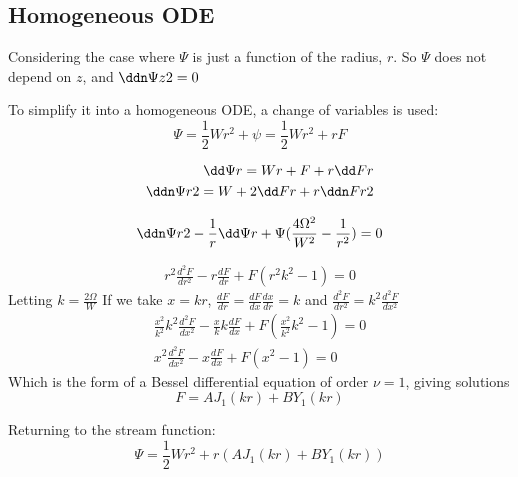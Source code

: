 \documentclass{X:/Documents/Coding/Latex/myreport}
\begin{document}
\clearpage
\subsection{Homogeneous ODE}
Considering the case where $\Psi$ is just a function of the radius, $r$. So $\Psi$ does not depend on $z$, and $\ddn\Psi z2 = 0$ 

To simplify it into a homogeneous ODE, a change of variables is used:
 \[\Psi = \frac12 W r^2 + \psi = \frac12 W r^2 + rF\]

\begin{align*}
    \dd\Psi r = Wr + F + r\dd F r\\
    \ddn\Psi r2 = W + 2\dd F r + r\ddn Fr 2
\end{align*}

\[ \ddn\Psi r2 - \frac1r \dd\Psi r + \Psi(\frac{4\Omega^2}{W^2} - \frac1{r^2}) = 0 \]

\begin{align*}
    r^2 \frac{d^2F}{dr^2} - r \frac{dF}{dr} + F(r^2k^2 - 1) = 0 
\end{align*}
Letting $k = \frac{2\Omega}{W}$
If we take $x = kr$, $\frac{dF}{dr} = \frac{dF}{dx} \frac{dx}{dr} = k$ and $\frac{d^2F}{dr^2} = k^2 \frac{d^2F}{dx^2}$
\begin{align*}
    \frac{x^2}{k^2}k^2 \frac{d^2F}{dx^2} - \frac{x}{k}k \frac{dF}{dx} + F(\frac{x^2}{k^2}k^2 - 1) = 0\\
    x^2 \frac{d^2F}{dx^2} - x \frac{dF}{dx} + F(x^2 - 1) = 0
\end{align*}
Which is the form of a Bessel differential equation of order $\nu =1$, giving solutions
\[F = AJ_1(kr) + BY_1(kr)  \]



Returning to the stream function:
\[\Psi = \frac12 W r^2 + r\left(AJ_1(kr) + BY_1(kr)\right)\]
\end{document}
